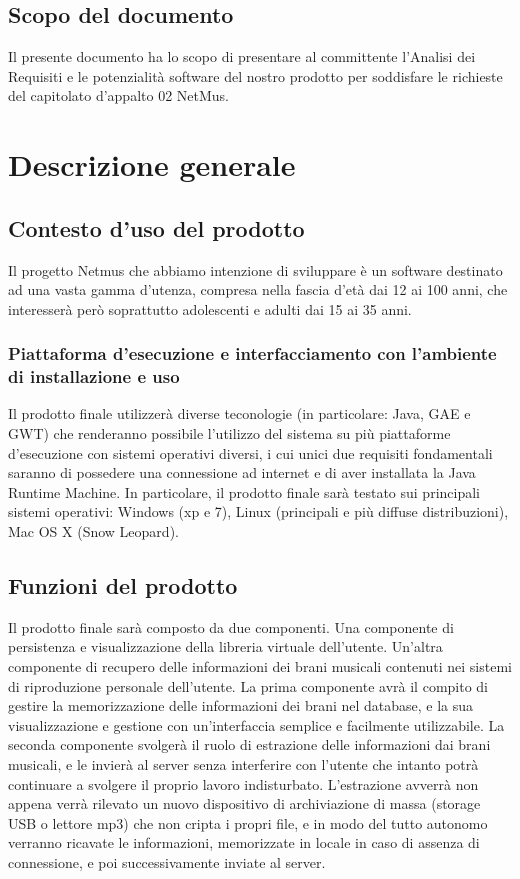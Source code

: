 \section{Scopo del documento}
Il presente documento ha lo scopo di presentare al committente l'Analisi dei
Requisiti e le potenzialit\`a software del nostro prodotto per soddisfare le
richieste del capitolato d'appalto 02 NetMus.



\chapter{Descrizione generale}
\thispagestyle{fancy}
\section{Contesto d'uso del prodotto}
Il progetto Netmus che abbiamo intenzione di sviluppare \`e un software
destinato ad una vasta gamma d'utenza, compresa nella fascia d'et\`a dai 12 ai
100 anni, che interesser\`a per\`o soprattutto adolescenti e adulti dai 15 ai 35 anni.
\subsection{Piattaforma d'esecuzione e interfacciamento con l'ambiente di
installazione e uso}
Il prodotto finale utilizzer\`a diverse teconologie (in particolare: Java, GAE e
GWT) che renderanno possibile l'utilizzo del sistema su pi\`u piattaforme
d'esecuzione con sistemi operativi diversi, i cui unici due requisiti
fondamentali saranno di possedere una connessione ad internet e di aver
installata la Java Runtime Machine. In particolare, il prodotto finale sar\`a
testato sui principali sistemi operativi: Windows (xp e 7), Linux (principali e
pi\`u diffuse distribuzioni), Mac OS X (Snow Leopard).
\section{Funzioni del prodotto}
Il prodotto finale sar\`a composto da due componenti. Una componente di
persistenza e visualizzazione della libreria virtuale dell'utente. Un'altra
componente di recupero delle informazioni dei brani musicali contenuti nei
sistemi di riproduzione personale dell'utente. La prima componente avr\`a il
compito di gestire la memorizzazione delle informazioni dei brani nel database,
e la sua visualizzazione e gestione con un'interfaccia semplice e facilmente
utilizzabile. La seconda componente svolger\`a il ruolo di estrazione delle
informazioni dai brani musicali, e le invier\`a al server senza interferire con
l'utente che intanto potr\`a continuare a svolgere il proprio lavoro indisturbato.
L'estrazione avverr\`a non appena verr\`a rilevato un nuovo dispositivo di
archiviazione di massa (storage USB o lettore mp3) che non cripta i propri file,
e in modo del tutto autonomo verranno ricavate le informazioni, memorizzate in
locale in caso di assenza di connessione, e poi successivamente inviate al server.
